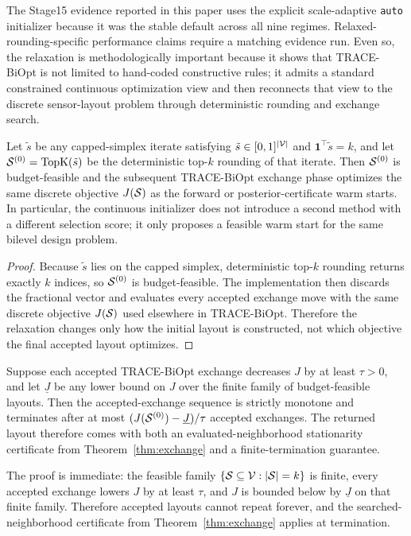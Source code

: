 The Stage15 evidence reported in this paper uses the explicit scale-adaptive
\texttt{auto} initializer because it was the stable default across all nine
regimes. Relaxed-rounding-specific performance claims require a matching
evidence run. Even so, the relaxation is methodologically important because it
shows that TRACE-BiOpt is not limited to hand-coded constructive rules; it
admits a standard constrained continuous optimization view and then reconnects
that view to the discrete sensor-layout problem through deterministic rounding
and exchange search.

\begin{proposition}
\label{prop:relax-consistency}
Let $\tilde s$ be any capped-simplex iterate satisfying
$\tilde s\in[0,1]^{|\mathcal{V}|}$ and $\mathbf{1}^{\top}\tilde s=k$, and let
$\mathcal{S}^{(0)}=\mathrm{TopK}(\tilde s)$ be the deterministic top-$k$ rounding of
that iterate. Then $\mathcal{S}^{(0)}$ is budget-feasible and the subsequent
TRACE-BiOpt exchange phase optimizes the same discrete objective $J(\mathcal{S})$ as
the forward or posterior-certificate warm starts. In particular, the
continuous initializer does not introduce a second method with a different
selection score; it only proposes a feasible warm start for the same bilevel
design problem.
\end{proposition}

\begin{proof}
Because $\tilde s$ lies on the capped simplex, deterministic top-$k$ rounding
returns exactly $k$ indices, so $\mathcal{S}^{(0)}$ is budget-feasible. The
implementation then discards the fractional vector and evaluates every accepted
exchange move with the same discrete objective $J(\mathcal{S})$ used elsewhere in
TRACE-BiOpt. Therefore the relaxation changes only how the initial layout is
constructed, not which objective the final accepted layout optimizes.
\end{proof}

\begin{proposition}
\label{prop:finite-termination}
Suppose each accepted TRACE-BiOpt exchange decreases $J$ by at least
$\tau>0$, and let $\underline{J}$ be any lower bound on $J$ over the finite
family of budget-feasible layouts. Then the accepted-exchange sequence is
strictly monotone and terminates after at most
$(J(\mathcal{S}^{(0)})-\underline{J})/\tau$ accepted exchanges. The returned layout
therefore comes with both an evaluated-neighborhood stationarity certificate
from Theorem~\ref{thm:exchange} and a finite-termination guarantee.
\end{proposition}
The proof is immediate: the feasible family
$\{\mathcal{S}\subseteq\mathcal{V}:|\mathcal{S}|=k\}$ is finite, every accepted exchange lowers
$J$ by at least $\tau$, and $J$ is bounded below by $\underline{J}$ on that
finite family. Therefore accepted layouts cannot repeat forever, and the
searched-neighborhood certificate from Theorem~\ref{thm:exchange} applies at
termination.

